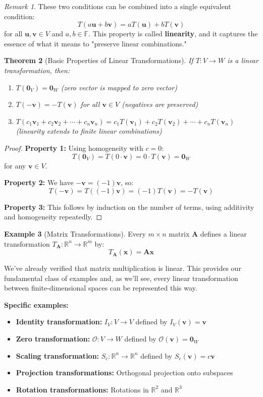 \documentclass[12pt]{article}
\numberwithin{equation}{section}
\newcommand{\vect}[1]{\boldsymbol{#1}}   %
\newcommand{\mat}[1]{\mathbf{#1}}        %
\theoremstyle{plain}
\newtheorem{theorem}{Theorem}[section]
\theoremstyle{definition}
\newtheorem{example}[theorem]{Example}
\theoremstyle{remark}
\newtheorem{remark}[theorem]{Remark}
\begin{document}
\begin{remark}
These two conditions can be combined into a single equivalent condition:
$$T(a\vect{u} + b\vect{v}) = aT(\vect{u}) + bT(\vect{v})$$
for all $\vect{u}, \vect{v} \in V$ and $a, b \in \mathbb{F}$. This property is called \textbf{linearity}, and it captures the essence of what it means to "preserve linear combinations."
\end{remark}

\begin{theorem}[Basic Properties of Linear Transformations]
If $T: V \to W$ is a linear transformation, then:
\begin{enumerate}
\item $T(\vect{0}_V) = \vect{0}_W$ (zero vector is mapped to zero vector)
\item $T(-\vect{v}) = -T(\vect{v})$ for all $\vect{v} \in V$ (negatives are preserved)
\item $T(c_1\vect{v}_1 + c_2\vect{v}_2 + \cdots + c_n\vect{v}_n) = c_1T(\vect{v}_1) + c_2T(\vect{v}_2) + \cdots + c_nT(\vect{v}_n)$ (linearity extends to finite linear combinations)
\end{enumerate}
\end{theorem}

\begin{proof}
\textbf{Property 1:} Using homogeneity with $c = 0$:
$$T(\vect{0}_V) = T(0 \cdot \vect{v}) = 0 \cdot T(\vect{v}) = \vect{0}_W$$
for any $\vect{v} \in V$.

\textbf{Property 2:} We have $-\vect{v} = (-1)\vect{v}$, so:
$$T(-\vect{v}) = T((-1)\vect{v}) = (-1)T(\vect{v}) = -T(\vect{v})$$

\textbf{Property 3:} This follows by induction on the number of terms, using additivity and homogeneity repeatedly.
\end{proof}

\begin{example}[Matrix Transformations]
Every $m \times n$ matrix $\mat{A}$ defines a linear transformation $T_{\mat{A}}: \mathbb{R}^n \to \mathbb{R}^m$ by:
$$T_{\mat{A}}(\vect{x}) = \mat{A}\vect{x}$$

We've already verified that matrix multiplication is linear. This provides our fundamental class of examples and, as we'll see, every linear transformation between finite-dimensional spaces can be represented this way.

\textbf{Specific examples:}
\begin{itemize}
\item \textbf{Identity transformation:} $I_V: V \to V$ defined by $I_V(\vect{v}) = \vect{v}$
\item \textbf{Zero transformation:} $\mathcal{O}: V \to W$ defined by $\mathcal{O}(\vect{v}) = \vect{0}_W$
\item \textbf{Scaling transformation:} $S_c: \mathbb{R}^n \to \mathbb{R}^n$ defined by $S_c(\vect{v}) = c\vect{v}$
\item \textbf{Projection transformations:} Orthogonal projection onto subspaces
\item \textbf{Rotation transformations:} Rotations in $\mathbb{R}^2$ and $\mathbb{R}^3$
\end{itemize}
\end{example}
\end{document}
